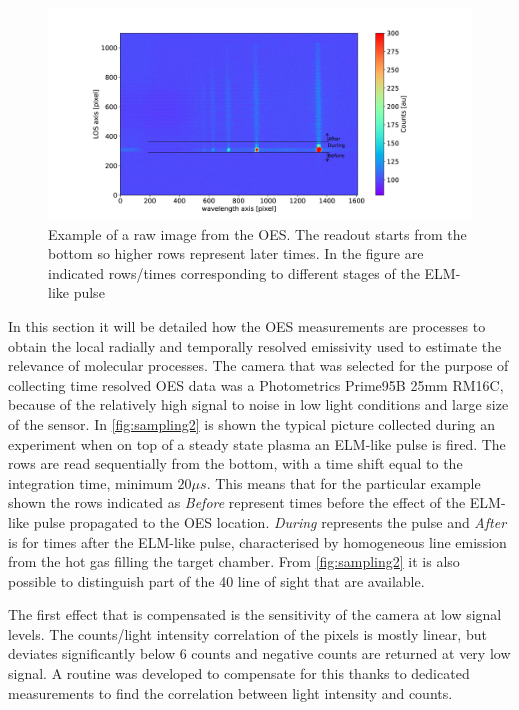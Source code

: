 \begin{figure}[!ht]
	\centering
	\includegraphics[width=0.7\linewidth,trim={440 50 600 150},clip]{Chapters/chapter3/figs/sample_oes.png}
	\caption{Example of a raw image from the OES. The readout starts from the bottom so higher rows represent later times. In the figure are indicated rows/times corresponding to different stages of the ELM-like pulse}
	\label{fig:sampling2}
\end{figure}

In this section it will be detailed how the OES measurements are processes to obtain the local radially and temporally resolved emissivity used to estimate the relevance of molecular processes.
The camera that was selected for the purpose of collecting time resolved OES data was a Photometrics Prime95B 25mm RM16C, because of the relatively high signal to noise in low light conditions and large size of the sensor. In \autoref{fig:sampling2} is shown the typical picture collected during an experiment when on top of a steady state plasma an ELM-like pulse is fired. The rows are read sequentially from the bottom, with a time shift equal to the integration time, minimum $20\mu s$. This means that for the particular example shown the rows indicated as \emph{Before} represent times before the effect of the ELM-like pulse propagated to the OES location. \emph{During} represents the pulse and \emph{After} is for times after the ELM-like pulse, characterised by homogeneous line emission from the hot gas filling the target chamber. From \autoref{fig:sampling2} it is also possible to distinguish part of the 40 line of sight that are available.

The first effect that is compensated is the sensitivity of the camera at low signal levels. The counts/light intensity correlation of the pixels is mostly linear, but deviates significantly below 6 counts and negative counts are returned at very low signal. A routine was developed to compensate for this thanks to dedicated measurements to find the correlation between light intensity and counts.

